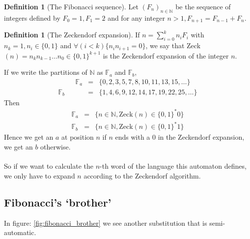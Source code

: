 \documentclass{article}
\theoremstyle{definition}
\newtheorem{definition}[theorem]{Definition}
\begin{document}
\begin{definition}[The Fibonacci sequence]
Let $(F_n)_{n \in \mathbb{N}}$ be the sequence of integers defined by $F_0 = 1,
F_1 = 2$ and for any integer $n > 1, F_{n + 1} = F_{n - 1} + F_n$.
\end{definition}

\begin{definition}[The Zeckendorf expansion]
If $n = \sum_{i = 0}^k n_i F_i$ with $n_k = 1, n_i \in \{0, 1\}$ and
$\forall (i < k) \{n_i n_{i + 1} = 0\}$, we say that
Zeck$(n) = n_k n_{k - 1} \ldots n_0 \in \{0, 1\}^{k + 1}$ is the Zeckendorf
expansion of the integer $n$.
\end{definition}

If we write the partitions of
$\mathbb{N}$ as $\mathbb{F}_a$ and $\mathbb{F}_b$,
\begin{eqnarray*}
\;\;\;\;\;\;\;\;\;
  \mathbb{F}_a &=& \{0, 2, 3, 5, 7, 8, 10, 11, 13, 15, \ldots\}\\
  \mathbb{F}_b &=& \{1, 4, 6, 9, 12, 14, 17, 19, 22, 25, \ldots\}
\end{eqnarray*}
Then
\begin{eqnarray*}
  \mathbb{F}_a &=& \{n \in \mathbb{N}, \mathrm{Zeck}(n) \in \{0, 1\}^* 0\}\\
  \mathbb{F}_b &=& \{n \in \mathbb{N}, \mathrm{Zeck}(n) \in \{0, 1\}^* 1\}
\end{eqnarray*}
Hence we get an $a$ at position $n$ if $n$ ends with a 0 in the
Zeckendorf expansion, we get an $b$ otherwise.\\
\\
So if we want to calculate the $n$-th word of the language this automaton 
defines, we only have to expand $n$ according to the Zeckendorf algorithm.

\subsection{Fibonacci's `brother'}
In figure: \ref{fig:fibonacci_brother} we see another substitution that is 
semi-automatic.
\end{document}

